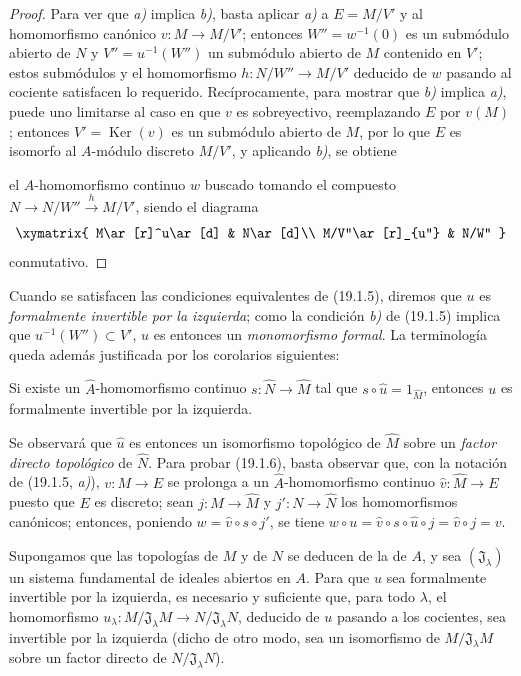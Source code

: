 \begin{proof}
Para ver que \emph{a)} implica \emph{b)}, basta aplicar \emph{a)} a $E=M/V'$ y al
homomorfismo canónico $v:M\to M/V'$; entonces $W''=w^{-1}(0)$ es un
submódulo abierto de $N$ y $V''=u^{-1}(W'')$ un submódulo abierto de $M$
contenido en $V'$; estos submódulos y el homomorfismo
$h:N/W''\to M/V'$ deducido de $w$ pasando al cociente satisfacen lo
requerido. Recíprocamente, para mostrar que \emph{b)} implica \emph{a)}, puede uno limitarse al
caso en que $v$ es sobreyectivo, reemplazando $E$ por $v(M)$; entonces
$V'=\operatorname{Ker}(v)$ es un submódulo abierto de $M$, por lo que $E$ es
isomorfo al $A$-módulo discreto $M/V'$, y aplicando \emph{b)}, se obtiene


el $A$-homomorfismo continuo $w$ buscado tomando el compuesto
$N\to N/W''\xrightarrow{h}M/V'$, siendo el diagrama
\[
  \xymatrix{
    M\ar[r]^u\ar[d] & N\ar[d]\\
    M/V''\ar[r]_{u''} & N/W''
  }
\]
conmutativo.
\end{proof}

Cuando se satisfacen las condiciones equivalentes de (19.1.5), diremos que
$u$ es \emph{formalmente invertible por la izquierda}; como la condición \emph{b)} de
(19.1.5) implica que $u^{-1}(W'')\subset V'$, $u$ es entonces un \emph{monomorfismo
formal}. La terminología queda además justificada por los corolarios siguientes:

\begin{corollary}[19.1.6]
\label{0.19.1.6-fr}
Si existe un $\widehat A$-homomorfismo continuo
$s:\widehat N\to\widehat M$ tal que
$s\circ\widehat u=1_{\widehat M}$, entonces $u$ es formalmente invertible por la
izquierda.
\end{corollary}

Se observará que $\widehat u$ es entonces un isomorfismo topológico de
$\widehat M$ sobre un \emph{factor directo topológico} de $\widehat N$. Para
probar (19.1.6), basta observar que, con la notación de (19.1.5, \emph{a)}),
$v:M\to E$ se prolonga a un $\widehat A$-homomorfismo continuo
$\widehat v:\widehat M\to E$ puesto que $E$ es discreto; sean
$j:M\to\widehat M$ y $j':N\to\widehat N$ los homomorfismos canónicos;
entonces, poniendo $w=\widehat v\circ s\circ j'$, se tiene
$w\circ u=\widehat v\circ s\circ\widehat u\circ j=\widehat v\circ j=v$.

\begin{corollary}[19.1.7]
\label{0.19.1.7-fr}
Supongamos que las topologías de $M$ y de $N$ se deducen de la de $A$,
y sea $(\mathfrak J_\lambda)$ un sistema fundamental de ideales abiertos en
$A$. Para que $u$ sea formalmente invertible por la izquierda, es necesario y suficiente
que, para todo $\lambda$, el homomorfismo
$u_\lambda:M/\mathfrak J_\lambda M\to N/\mathfrak J_\lambda N$, deducido de
$u$ pasando a los cocientes, sea invertible por la izquierda \textup{(dicho de otro modo, sea
un isomorfismo de $M/\mathfrak J_\lambda M$ sobre un factor directo de
$N/\mathfrak J_\lambda N$)}.
\end{corollary}


